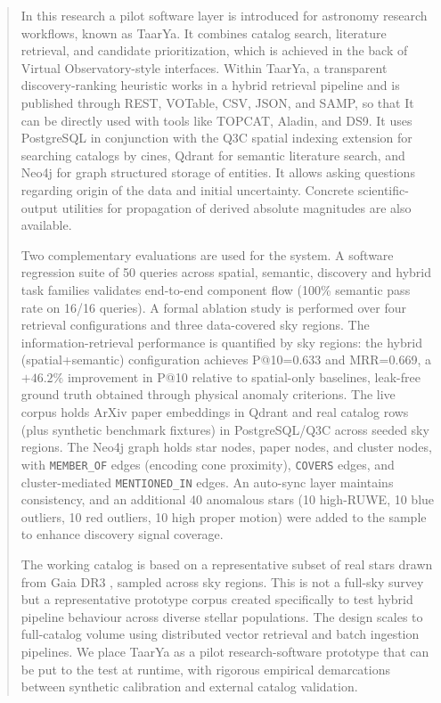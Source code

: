 \documentclass[preprint,12pt,authoryear]{elsarticle}
\begin{document}
\begin{frontmatter}
\begin{abstract}
In this research a pilot software layer is introduced for astronomy research workflows, known as \textsf{TaarYa}. It combines catalog search, literature retrieval, and candidate prioritization, which is achieved in the back of Virtual Observatory-style interfaces. Within \textsf{TaarYa}, a transparent discovery-ranking heuristic works in a hybrid retrieval pipeline and is published through REST, VOTable, CSV, JSON, and SAMP, so that It can be directly used with tools like TOPCAT, Aladin, and DS9. It uses PostgreSQL in conjunction with the Q3C spatial indexing extension for searching catalogs by cines, Qdrant for semantic literature search, and Neo4j for graph structured storage of entities. It allows asking questions regarding origin of the data and initial uncertainty. Concrete scientific-output utilities for propagation of derived absolute magnitudes are also available.

Two complementary evaluations are used for the system. A software regression suite of 50 queries across spatial, semantic, discovery and hybrid task families validates end-to-end component flow (100\% semantic pass rate on 16/16 queries). A formal ablation study is performed over four retrieval configurations and three data-covered sky regions. The information-retrieval performance is quantified by sky regions: the hybrid (spatial+semantic) configuration achieves P@10=0.633 and MRR=0.669, a $+46.2\%$ improvement in P@10 relative to spatial-only baselines, leak-free ground truth obtained through physical anomaly criterions. The live corpus holds \nPapersQdrant{} ArXiv paper embeddings in Qdrant and \nStarsReal{} real catalog rows (plus \nStarsSynthetic{} synthetic benchmark fixtures) in PostgreSQL/Q3C across \nClusterNodes{} seeded sky regions. The Neo4j graph holds \nStarNodes{} star nodes, \nPaperNodes{} paper nodes, and \nClusterNodes{} cluster nodes, with \nMemberOfEdges{} \texttt{MEMBER\_OF} edges (encoding cone proximity), \nCoversEdges{} \texttt{COVERS} edges, and \nMentionedInEdges{} cluster-mediated \texttt{MENTIONED\_IN} edges. An auto-sync layer maintains consistency, and an additional 40 anomalous stars (10 high-RUWE, 10 blue outliers, 10 red outliers, 10 high proper motion) were added to the sample to enhance discovery signal coverage.

The working catalog is based on a representative subset of \nStarsReal{} real stars drawn from Gaia DR3 \citep{Vallenari2023}, sampled across \nClusterNodes{} sky regions. This is not a full-sky survey but a representative prototype corpus created specifically to test hybrid pipeline behaviour across diverse stellar populations. The design scales to full-catalog volume using distributed vector retrieval and batch ingestion pipelines. We place \textsf{TaarYa} as a pilot research-software prototype that can be put to the test at runtime, with rigorous empirical demarcations between synthetic calibration and external catalog validation.
\end{abstract}


\end{frontmatter}
\end{document}
